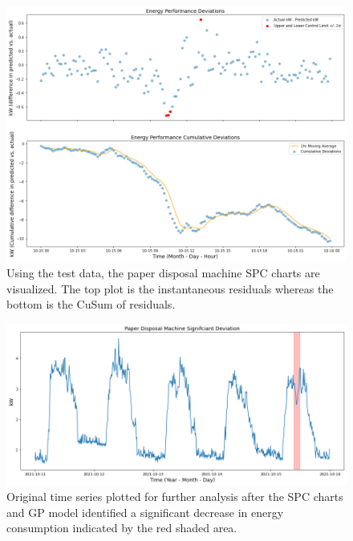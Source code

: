 \begin{figure}[h]
\centering
\graphicspath{ {./images/} }
\includegraphics[scale=0.49]{images/entsorgung_test_SPC.png}
\caption{Using the test data, the paper disposal machine SPC charts are visualized. The top plot is the instantaneous residuals whereas the bottom is the CuSum of residuals.}
\label{fig:fig15}
\end{figure}

\begin{figure}[h]
\centering
\graphicspath{ {./images/} }
\includegraphics[scale=0.49]{images/entsorgung_deviation.png}
\caption{Original time series plotted for further analysis after the SPC charts and GP model identified a significant decrease in energy consumption indicated by the red shaded area.}
\label{fig:fig16}
\end{figure}

